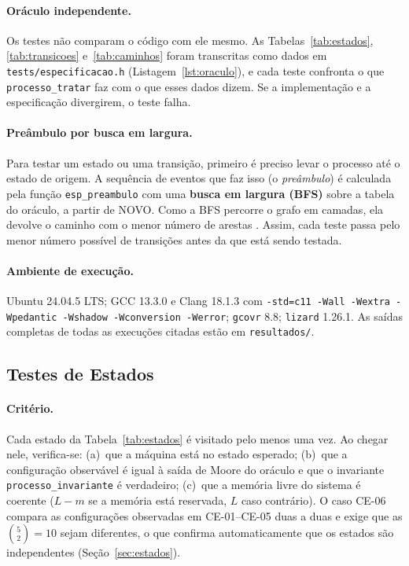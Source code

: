 \documentclass[11pt,a4paper]{article}
\theoremstyle{definition}
\newcommand{\est}[1]{\textsf{\small #1}}   %
\begin{document}
\paragraph{Oráculo independente.} Os testes não comparam o código com ele mesmo. As
Tabelas~\ref{tab:estados}, \ref{tab:transicoes} e~\ref{tab:caminhos} foram transcritas como dados em
\texttt{tests/especificacao.h} (Listagem~\ref{lst:oraculo}), e cada teste confronta o que
\texttt{processo\_tratar} faz com o que esses dados dizem. Se a implementação e a especificação
divergirem, o teste falha.



\paragraph{Preâmbulo por busca em largura.} Para testar um estado ou uma transição, primeiro é
preciso levar o processo até o estado de origem. A sequência de eventos que faz isso (o
\emph{preâmbulo}) é calculada pela função \texttt{esp\_preambulo} com uma \textbf{busca em largura
(BFS)} sobre a tabela do oráculo, a partir de \est{NOVO}. Como a BFS percorre o grafo em camadas,
ela devolve o caminho com o menor número de arestas \cite{cormen}. Assim, cada teste passa pelo
menor número possível de transições antes da que está sendo testada.

\paragraph{Ambiente de execução.} Ubuntu 24.04.5 LTS; GCC 13.3.0 e Clang 18.1.3 com
\texttt{-std=c11 -Wall -Wextra -Wpedantic -Wshadow -Wconversion -Werror}; \texttt{gcovr} 8.8;
\texttt{lizard} 1.26.1. As saídas completas de todas as execuções citadas estão em
\texttt{resultados/}.

\subsection{Testes de Estados}\label{sec:testes-estados}

\paragraph{Critério.} Cada estado da Tabela~\ref{tab:estados} é visitado pelo menos uma vez. Ao
chegar nele, verifica-se:
(a)~que a máquina está no estado esperado;
(b)~que a configuração observável é igual à saída de Moore do oráculo e que o invariante
\texttt{processo\_invariante} é verdadeiro;
(c)~que a memória livre do sistema é coerente ($L - m$ se a memória está reservada, $L$ caso
contrário). O caso CE-06 compara as configurações observadas em CE-01--CE-05 duas a duas e exige
que as $\binom{5}{2} = 10$ sejam diferentes, o que confirma automaticamente que os estados são
independentes (Seção~\ref{sec:estados}).
\end{document}
